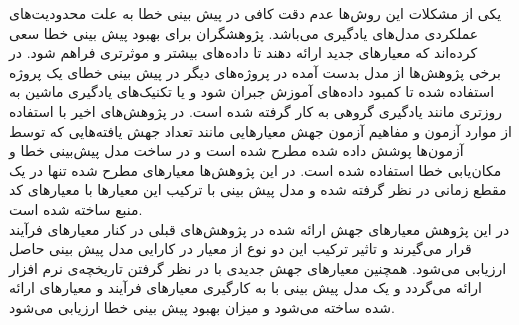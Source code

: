   یکی از مشکلات این روش‌ها عدم دقت کافی در پیش بینی خطا به علت محدودیت‌های عملکردی مدل‌های یادگیری می‌باشد. پژوهشگران برای بهبود پیش بینی خطا سعی کرده‌اند که معیارهای جدید ارائه دهند تا داده‌های بیشتر و موثرتری فراهم شود. در برخی پژوهش‌ها از مدل بدست آمده در پروژه‌های دیگر در پیش بینی خطای یک پروژه استفاده شده تا کمبود داده‌های آموزش جبران شود و یا تکنیک‌های یادگیری ماشین به روزتری مانند یادگیری گروهی به کار گرفته شده است. در پژوهش‌های اخیر  با استفاده از موارد آزمون و مفاهیم آزمون جهش معیارهایی مانند تعداد جهش یافته‌هایی که توسط آزمون‌ها پوشش داده شده مطرح  شده است و در ساخت مدل پیش‌بینی خطا \cite{bowes2016mutation} و مکان‌یابی خطا  \cite {papadakis2015metallaxis}استفاده شده است. در این پژوهش‌ها معیارهای مطرح شده تنها در یک مقطع زمانی در نظر گرفته شده و مدل پیش بینی با ترکیب این معیارها با معیارهای کد منبع ساخته شده است.\\
  
 در این پژوهش معیارهای جهش ارائه شده در پژوهش‌های قبلی در کنار معیارهای فرآیند قرار می‌گیرند و تاثیر ترکیب این دو نوع از معیار در کارایی مدل پیش بینی حاصل ارزیابی می‌شود. همچنین معیارهای جهش جدیدی با در نظر گرفتن تاریخچه‌ی نرم افزار ارائه می‌گردد و یک مدل پیش بینی با به کارگیری معیارهای فرآیند و معیارهای ارائه شده ساخته می‌شود و میزان بهبود پیش بینی خطا ارزیابی می‌شود.  
